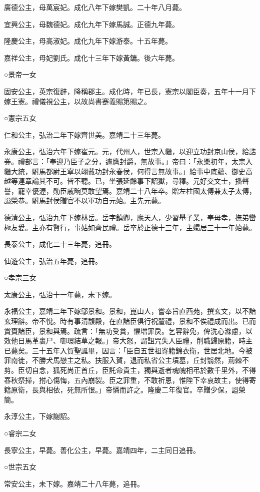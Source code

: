 廣德公主，母萬宸妃。成化八年下嫁樊凱。二十年八月薨。

宜興公主，母魏德妃。成化九年下嫁馬誠。正德九年薨。

隆慶公主，母高淑妃。成化九年下嫁游泰。十五年薨。

嘉祥公主，母妃劉氏。成化十三年下嫁黃鏞。後六年薨。

○景帝一女

固安公主，英宗復辟，降稱郡主。成化時，年已長，憲宗以閣臣奏，五年十一月下嫁王憲。禮儀視公主，以故尚書蹇義賜第賜之。

○憲宗五女

仁和公主，弘治二年下嫁齊世美。嘉靖二十三年薨。

永康公主，弘治六年下嫁崔元。元，代州人，世宗入繼，以迎立功封京山侯，給誥券。禮部言：「奉迎乃臣子之分，遽膺封爵，無故事。」帝曰：「永樂初年，太宗入繼大統，駙馬都尉王寧以翊戴功封永春侯，何得言無故事。」給事中底蘊、御史高越等連章論其不可。皆不聽。已，坐張延齡事下詔獄，尋釋。元好交文士，播聲譽，寵幸優渥，勛臣戚畹莫敢望焉。嘉靖二十八年卒。贈左柱國太傅兼太子太傅，謚榮恭。駙馬封侯贈官不以軍功自元始。主先元薨。

德清公主，弘治九年下嫁林岳。岳字鎮卿，應天人，少習舉子業，奉母孝，撫弟巒極友愛。主亦有賢行，事姑如齊民禮。岳卒於正德十三年，主孀居三十一年始薨。

長泰公主，成化二十三年薨，追冊。

仙遊公主，弘治五年薨，追冊。

○孝宗三女

太康公主，弘治十一年薨，未下嫁。

永福公主，嘉靖二年下嫁鄔景和。景和，崑山人，嘗奉旨直西苑，撰玄文，以不諳玄理辭。帝不悅。時有事清馥殿，在直諸臣俱行祝釐禮，景和不俟禮成而出。已而賞賚諸臣，景和與焉。疏言：「無功受賞，懼增罪戾。乞容辭免，俾洗心滌慮，以效他日馬革裹尸、啣環結草之報。」帝大怒，謂詛咒失人臣禮，削職歸原籍，時主已薨矣。三十五年入賀聖誕畢，因言：「臣自五世祖寄籍錦衣衛，世居北地。今被罪南徙，不勝犬馬戀主之私。扶服入賀，退而私省公主墳墓，丘封翳然，荊棘不剪。臣切自念，狐死尚正首丘，臣託命貴主，獨與逝者魂魄相弔於數千里外，不得春秋祭掃，拊心傷悔，五內崩裂。臣之罪重，不敢祈恩，惟陛下幸哀故主，使得寄籍原衛，長與相依，死無所恨。」帝憐而許之。隆慶二年復官。卒贈少保，謚榮簡。

永淳公主，下嫁謝詔。

○睿宗二女

長寧公主，早薨。善化公主，早薨。嘉靖四年，二主同日追冊。

○世宗五女

常安公主，未下嫁。嘉靖二十八年薨，追冊。

